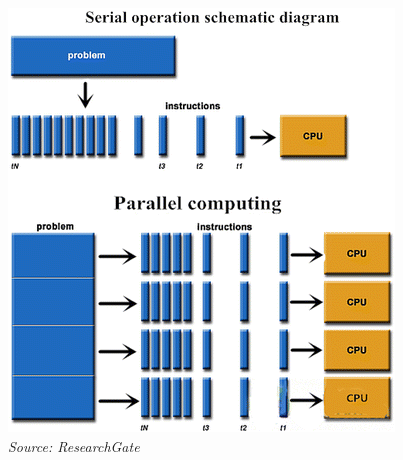 \begin{frame}
\begin{columns}
	\begin{figure}
		\includegraphics[width=\textwidth]{img/serial-parallel.png}
		{\hspace*{\fill}\tiny\textit{Source: ResearchGate}}
	\end{figure}
\end{columns}

\end{frame}